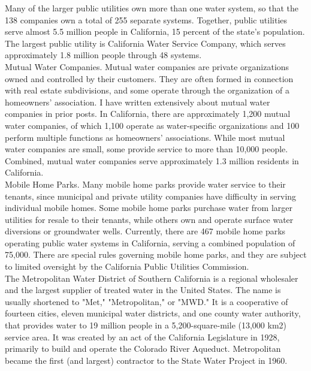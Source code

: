 \documentclass{article}
\begin{document}
Many of the larger public utilities own more than one water system, so that the 138 companies own a total of 255 separate systems. Together, public utilities serve almost 5.5 million people in California, 15 percent of the state’s population. The largest public utility is California Water Service Company, which serves approximately 1.8 million people through 48 systems.\\

Mutual Water Companies.  Mutual water companies are private organizations owned and controlled by their customers. They are often formed in connection with real estate subdivisions, and some operate through the organization of a homeowners’ association. I have written extensively about mutual water companies in prior posts. In California, there are approximately 1,200 mutual water companies, of which 1,100 operate as water-specific organizations and 100 perform multiple functions as homeowners’ associations. While most mutual water companies are small, some provide service to more than 10,000 people. Combined, mutual water companies serve approximately 1.3 million residents in California.\\

Mobile Home Parks.  Many mobile home parks provide water service to their tenants, since municipal and private utility companies have difficulty in serving individual mobile homes. Some mobile home parks purchase water from larger utilities for resale to their tenants, while others own and operate surface water diversions or groundwater wells. Currently, there are 467 mobile home parks operating public water systems in California, serving a combined population of 75,000. There are special rules governing mobile home parks, and they are subject to limited oversight by the California Public Utilities Commission.\\


The Metropolitan Water District of Southern California is a regional wholesaler and the largest supplier of treated water in the United States. The name is usually shortened to "Met," "Metropolitan," or "MWD." It is a cooperative of fourteen cities, eleven municipal water districts, and one county water authority, that provides water to 19 million people in a 5,200-square-mile (13,000 km2) service area. It was created by an act of the California Legislature in 1928, primarily to build and operate the Colorado River Aqueduct. Metropolitan became the first (and largest) contractor to the State Water Project in 1960.\\
\end{document}
